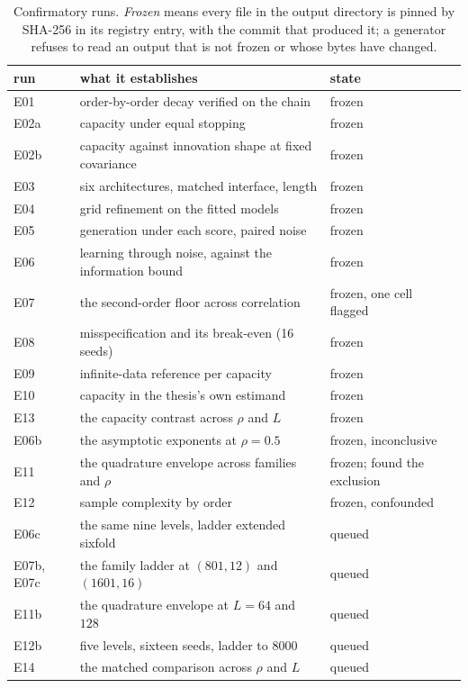 \documentclass[11pt,a4paper]{article}
\begin{document}
\begin{table}[htbp]
\centering
\small
\caption{Confirmatory runs. \emph{Frozen} means every file in the output directory is pinned by
SHA-256 in its registry entry, with the commit that produced it; a generator refuses to read an
output that is not frozen or whose bytes have changed.}
\label{tab:status}
\begin{tabular}{l l l}
\toprule
run & what it establishes & state \\
\midrule
E01  & order-by-order decay verified on the chain              & frozen \\
E02a & capacity under equal stopping                            & frozen \\
E02b & capacity against innovation shape at fixed covariance    & frozen \\
E03  & six architectures, matched interface, length             & frozen \\
E04  & grid refinement on the fitted models                     & frozen \\
E05  & generation under each score, paired noise                & frozen \\
E06  & learning through noise, against the information bound    & frozen \\
E07  & the second-order floor across correlation                & frozen, one cell flagged \\
E08  & misspecification and its break-even (16 seeds)           & frozen \\
E09  & infinite-data reference per capacity                     & frozen \\
E10  & capacity in the thesis's own estimand                    & frozen \\
E13  & the capacity contrast across $\rho$ and $L$              & frozen \\
\midrule
E06b & the asymptotic exponents at $\rho=0.5$                   & frozen, inconclusive \\
E11  & the quadrature envelope across families and $\rho$       & frozen; found the exclusion \\
E12  & sample complexity by order                               & frozen, confounded \\
\midrule
E06c & the same nine levels, ladder extended sixfold            & queued \\
E07b, E07c & the family ladder at $(801,12)$ and $(1601,16)$    & queued \\
E11b & the quadrature envelope at $L=64$ and $128$              & queued \\
E12b & five levels, sixteen seeds, ladder to $8000$             & queued \\
E14  & the matched comparison across $\rho$ and $L$             & queued \\
\bottomrule
\end{tabular}
\end{table}
\end{document}
